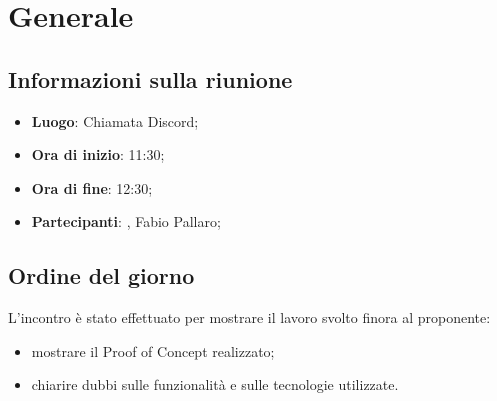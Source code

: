 \section{Generale}

\vspace{10pt}


\subsection{Informazioni sulla riunione}
\begin{itemize}
	\item \textbf{Luogo}: Chiamata Discord;
	\item \textbf{Ora di inizio}: 11:30;
	\item \textbf{Ora di fine}: 12:30;
	\item \textbf{Partecipanti}: \team, Fabio Pallaro;
\end{itemize}

\vspace{5pt}

\subsection{Ordine del giorno}
L'incontro è stato effettuato per mostrare il lavoro svolto finora al proponente:
\begin{itemize}
	\item mostrare il Proof of Concept realizzato;
	\item chiarire dubbi sulle funzionalità e sulle tecnologie utilizzate.
\end{itemize}

